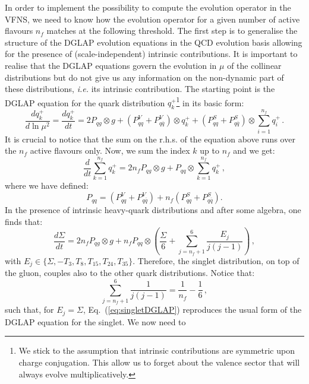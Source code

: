 \documentclass[10pt,a4paper]{article}
\begin{document}
In order to implement the possibility to compute the evolution
operator in the VFNS, we need to know how the evolution operator for a
given number of active flavours $n_f$ matches at the following
threshold. The first step is to generalise the structure of the DGLAP
evolution equations in the QCD evolution basis allowing for the
presence of (scale-independent) intrinsic contributions. It is
important to realise that the DGLAP equations govern the evolution in
$\mu$ of the collinear distributions but do not give us any
information on the non-dynamic part of these distributions,
\textit{i.e.} its intrinsic contribution. The starting point is the
DGLAP equation for the quark distribution $q_k^+$\footnote{We stick to
  the assumption that intrinsic contributions are symmetric upon
  charge conjugation. This allow us to forget about the valence sector
  that will always evolve multiplicatively.} in its basic form:
\begin{equation}
\frac{dq_k^+}{d\ln\mu^2} =\frac{dq_k^+}{dt}= 2P_{qg}\otimes g+
(P_{qq}^V+P_{q\overline{q}}^V)\otimes
q_k^++(P_{qq}^S+P_{q\overline{q}}^S)\otimes \sum_{i=1}^{n_f} q_i^+\,.
\end{equation}
It is crucial to notice that the sum on the r.h.s. of the equation
above runs over the $n_f$ active flavours only. Now, we sum the index
$k$ up to $n_f$ and we get:
\begin{equation}
\frac{d}{dt}\sum_{k=1}^{n_f} q_k^+= 2n_f P_{qg}\otimes g+
P_{qq}\otimes \sum_{k=1}^{n_f} q_k^+\,,
\end{equation}
where we have defined:
\begin{equation}
P_{qq} = (P_{qq}^V+P_{q\overline{q}}^V)+n_f(P_{qq}^S+P_{q\overline{q}}^S).
\end{equation}
In the presence of intrinsic heavy-quark distributions and after some
algebra, one finds that:
\begin{equation}\label{eq:singletDGLAP}
\frac{d\Sigma}{dt}= 2n_f P_{qg}\otimes g+n_fP_{qq}\otimes \left(\frac{\Sigma}{6}+\sum_{j=n_f+1}^6\frac{E_j}{j(j-1)}\right)\,,
\end{equation}
with $E_j\in \{\Sigma,-T_3,T_8,T_{15},T_{24},T_{35}\}$. Therefore, the
singlet distribution, on top of the gluon, couples also to the other
quark distributions. Notice that:
\begin{equation}
\sum_{j=n_f+1}^6\frac{1}{j(j-1)} = \frac{1}{n_f}-\frac16\,,
\end{equation}
such that, for $E_j = \Sigma$, Eq.~(\ref{eq:singletDGLAP}) reproduces
the usual form of the DGLAP equation for the singlet. We now need to
\end{document}
